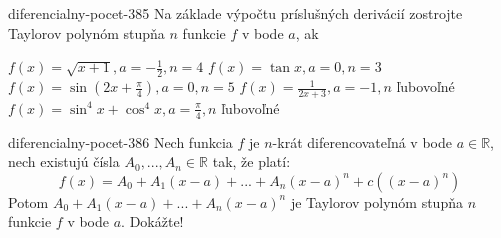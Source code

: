 \begin{defproblem}{diferencialny-pocet-385}
Na základe výpočtu príslušných derivácií zostrojte Taylorov polynóm stupňa $n$
funkcie $f$ v bode $a$, ak
\begin{tasks}
\task $f(x)=\sqrt{x+1},a=-\frac{1}{2},n=4$
\task $f(x)=\tan x,a=0,n=3$
\task $f(x)=\sin (2x+\frac{\pi}{4}),a=0,n=5$
\task $f(x)=\frac{1}{2x+3},a=-1,n$ ľubovoľné
\task $f(x)=\sin^4 x+\cos^4 x,a=\frac{\pi}{4},n$ ľubovoľné
\end{tasks}
\end{defproblem}

\begin{defproblem}{diferencialny-pocet-386}
Nech funkcia $f$ je $n$-krát diferencovateľná v bode $a\in\mathbb{R}$, nech
existujú čísla $A_0,...,A_n\in\mathbb{R}$ tak, že platí:
\[
  f(x)=A_0+A_1(x-a)+...+A_n(x-a)^n+c((x-a)^n)
\]
Potom  $A_0+A_1(x-a)+...+A_n(x-a)^n$ je Taylorov polynóm stupňa $n$ funkcie $f$
v bode $a$. Dokážte!
\end{defproblem}

